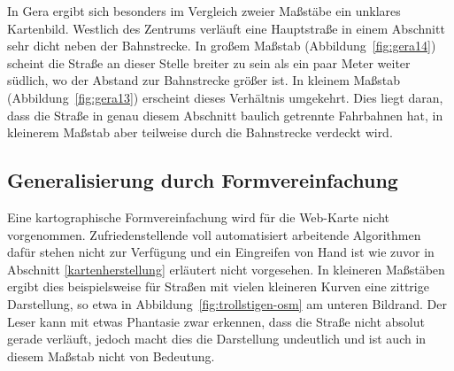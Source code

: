 \documentclass[../main/thesis.tex]{subfiles}
\begin{document}
In Gera ergibt sich besonders im Vergleich zweier Maßstäbe ein unklares Kartenbild.
Westlich des Zentrums verläuft eine Hauptstraße in einem Abschnitt sehr dicht neben der Bahnstrecke.
In großem Maßstab (Abbildung~\ref{fig:gera14}) scheint die Straße an dieser Stelle breiter zu sein als ein paar Meter weiter südlich, wo der Abstand zur Bahnstrecke größer ist.
In kleinem Maßstab (Abbildung~\ref{fig:gera13}) erscheint dieses Verhältnis umgekehrt.
Dies liegt daran, dass die Straße in genau diesem Abschnitt baulich getrennte Fahrbahnen hat, in kleinerem Maßstab aber teilweise durch die Bahnstrecke verdeckt wird.





\subsection{Generalisierung durch Formvereinfachung}

Eine kartographische Formvereinfachung wird für die Web-Karte nicht vorgenommen.
Zufriedenstellende voll automatisiert arbeitende Algorithmen dafür stehen nicht zur Verfügung und ein Eingreifen von Hand ist wie zuvor in Abschnitt \ref{kartenherstellung} erläutert nicht vorgesehen. 
In kleineren Maßstäben ergibt dies beispielsweise für Straßen mit vielen kleineren Kurven eine zittrige Darstellung, so etwa in Abbildung~\ref{fig:trollstigen-osm} am unteren Bildrand.
Der Leser kann mit etwas Phantasie zwar erkennen, dass die Straße nicht absolut gerade verläuft, jedoch macht dies die Darstellung undeutlich und ist auch in diesem Maßstab nicht von Bedeutung.
\end{document}

